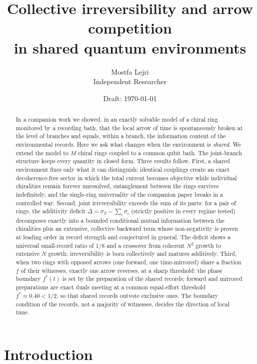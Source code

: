 \documentclass[11pt]{article}
\title{\bfseries Collective irreversibility and arrow competition\\ in shared quantum environments}
\author{Mostfa Lejri\\[2pt]
\small Independent Researcher}
\date{\small Draft: \today}
\begin{document}
\maketitle

\begin{abstract}
\noindent
In a companion work we showed, in an exactly solvable model of a chiral ring monitored by a recording bath, that the local arrow of time is spontaneously broken at the level of branches and equals, within a branch, the information content of the environmental records. Here we ask what changes when the environment is \emph{shared}. We extend the model to $M$ chiral rings coupled to a common qubit bath. The joint-branch structure keeps every quantity in closed form. Three results follow. First, a shared environment fixes only what it can distinguish: identical couplings create an exact decoherence-free sector in which the total current becomes objective while individual chiralities remain forever unresolved, entanglement between the rings survives indefinitely, and the single-ring universality of the companion paper breaks in a controlled way. Second, joint irreversibility exceeds the sum of its parts: for a pair of rings, the additivity deficit $\Delta=\sigma_S-\sum_i\sigma_i$ (strictly positive in every regime tested) decomposes exactly into a bounded conditional mutual information between the chiralities plus an extensive, collective backward term whose non-negativity is proven at leading order in record strength and conjectured in general. The deficit shows a universal small-record ratio of $1/8$ and a crossover from coherent $N^2$ growth to extensive $N$ growth: irreversibility is born collectively and matures additively. Third, when two rings with opposed arrows (one forward, one time-mirrored) share a fraction $f$ of their witnesses, exactly one arrow reverses, at a sharp threshold: the phase boundary $f^*(t)$ is set by the preparation of the shared records; forward and mirrored preparations are exact duals meeting at a common equal-effort threshold $f^*\approx0.40<1/2$, so that shared records outvote exclusive ones. The boundary condition of the records, not a majority of witnesses, decides the direction of local time.
\end{abstract}

\tableofcontents

\section{Introduction}
\end{document}
